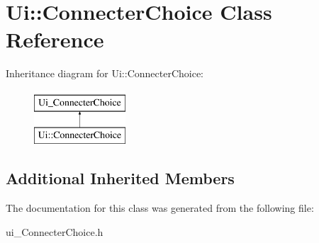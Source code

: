 \hypertarget{class_ui_1_1_connecter_choice}{\section{Ui\-:\-:Connecter\-Choice Class Reference}
\label{class_ui_1_1_connecter_choice}
}
Inheritance diagram for Ui\-:\-:Connecter\-Choice\-:\begin{figure}[H]
\begin{center}
\leavevmode
\includegraphics[height=2.000000cm]{class_ui_1_1_connecter_choice}
\end{center}
\end{figure}
\subsection*{Additional Inherited Members}


The documentation for this class was generated from the following file\-:\begin{DoxyCompactItemize}
\item 
ui\-\_\-\-Connecter\-Choice.\-h\end{DoxyCompactItemize}
